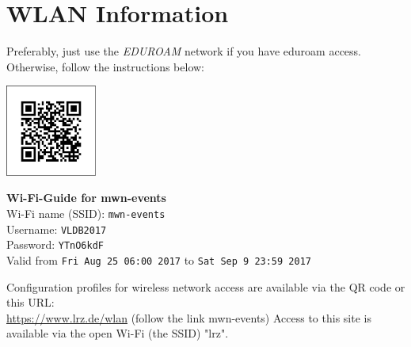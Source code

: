 
\clearpage
\section{WLAN Information}

Preferably, just use the {\em EDUROAM} network if you have eduroam access. Otherwise, follow the instructions below:

\vspace{5mm}
\begin{center}
    \includegraphics[width=30mm, trim=12mm 10mm 12mm 10mm, clip]{images/mwn-events.pdf}
\end{center}

\vspace{5mm}
\begin{sloppypar}
\textbf{Wi-Fi-Guide for mwn-events} \\
Wi-Fi name (SSID): \texttt{mwn-events} \\
Username: \texttt{VLDB2017} \\
Password: \texttt{YTnO6kdF} \\
Valid from \texttt{Fri Aug 25 06:00 2017} to \texttt{Sat Sep 9 23:59 2017}

\vspace{2mm}
Configuration profiles for wireless network access are available via
the QR code or this URL:\\
\url{https://www.lrz.de/wlan} (follow the link mwn-events)
Access to this site is available via the open Wi-Fi (the SSID) "lrz".
\end{sloppypar}
